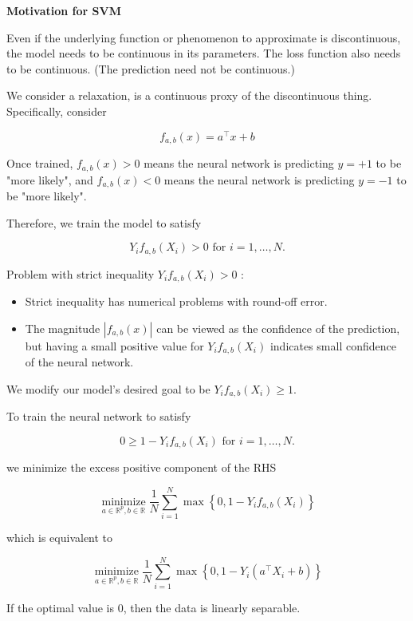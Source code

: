 \textbf{Motivation for SVM}

Even if the underlying function or phenomenon to approximate is discontinuous, the model needs to be continuous in its parameters. The loss function also needs to be continuous. (The prediction need not be continuous.)

We consider a relaxation, is a continuous proxy of the discontinuous thing. Specifically, consider

$$
f_{a, b}(x)=a^{\top} x+b
$$

Once trained, $f_{a, b}(x)>0$ means the neural network is predicting $y=+1$ to be "more likely", and $f_{a, b}(x)<0$ means the neural network is predicting $y=-1$ to be "more likely".

Therefore, we train the model to satisfy

$$
Y_{i} f_{a, b}\left(X_{i}\right)>0 \text { for } i=1, \ldots, N .
$$

Problem with strict inequality $Y_{i} f_{a, b}\left(X_{i}\right)>0$ :

\begin{itemize}
    \item Strict inequality has numerical problems with round-off error.
    \item The magnitude $\left|f_{a, b}(x)\right|$ can be viewed as the confidence of the prediction, but having a small positive value for $Y_{i} f_{a, b}\left(X_{i}\right)$ indicates small confidence of the neural network.
\end{itemize}

We modify our model's desired goal to be $Y_{i} f_{a, b}\left(X_{i}\right) \geq 1$.

To train the neural network to satisfy

$$
0 \geq 1-Y_{i} f_{a, b}\left(X_{i}\right) \text { for } i=1, \ldots, N .
$$

we minimize the excess positive component of the RHS

$$
\underset{a \in \mathbb{R}^{p}, b \in \mathbb{R}}{\operatorname{minimize}} \frac{1}{N} \sum_{i=1}^{N} \max \left\{0,1-Y_{i} f_{a, b}\left(X_{i}\right)\right\}
$$

which is equivalent to

$$
\underset{a \in \mathbb{R}^{p}, b \in \mathbb{R}}{\operatorname{minimize}} \frac{1}{N} \sum_{i=1}^{N} \max \left\{0,1-Y_{i}\left(a^{\top} X_{i}+b\right)\right\}
$$

If the optimal value is 0, then the data is linearly separable.

